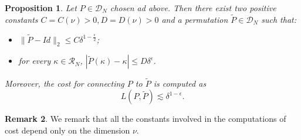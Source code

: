 \documentclass[12 pt]{article}
\theoremstyle{definition} \newtheorem{definition}{Definition}[section]
\theoremstyle{definition} \newtheorem{remark}[definition]{Remark}
\theoremstyle{plain} \newtheorem{lemma}[definition]{Lemma}
\theoremstyle{plain} \newtheorem{proposition}[definition]{Proposition}
\theoremstyle{plain} \newtheorem{theorem}[definition]{Theorem}
\theoremstyle{plain} \newtheorem{corollary}[definition]{Corollary}
\theoremstyle{definition} \newtheorem{example}[definition]{Example}
\theoremstyle{definition} \newtheorem{assumption}[definition]{Assumption}
\theoremstyle{definition} \newtheorem{conjecture}[definition]{Conjecture}
\newcommand{\1}{\mathbbm 1}
\numberwithin{equation}{section}
\begin{document}
\begin{proposition}\label{prop:Step1}
    Let $P\in\mathcal{D}_N$ chosen ad above. Then there exist two positive constants $C=C(\nu)>0, D=D(\nu)>0$ and a permutation $\tilde P\in\mathcal{D}_N$ such that:
    \begin{itemize}
        \item $\|\tilde P-Id\|_2\leq C\delta^{1-\frac{\epsilon}{2}}$;
        \item for every $\kappa\in \mathcal{R}_N$, $|\tilde P(\kappa)-\kappa|\leq D{\delta}^{\epsilon}$.
    \end{itemize} 
    Moreover, the cost for connecting $P$ to $\tilde P$ is computed as
    \begin{equation}\label{eq:cost:step:1}
        L(P,\tilde P)\lesssim \delta^{1-\epsilon}.
    \end{equation}
\end{proposition}

\begin{remark}
    We remark that all the constants involved in the computations of cost depend only on the dimension $\nu$.
\end{remark}
\end{document}
